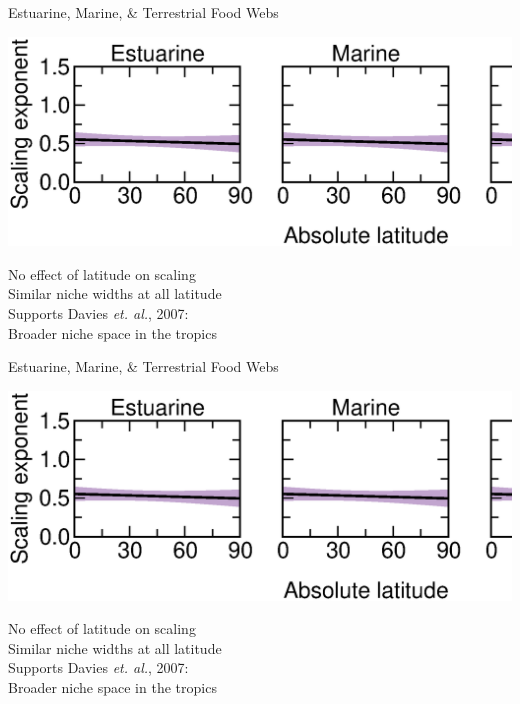 \documentclass{beamer}
\begin{document}
  \begin{frame}{Estuarine, Marine, \& Terrestrial Food Webs}
    \begin{center}
      \includegraphics*[width=.8\textwidth]{Figures/results/no_effect.eps}

      \vspace{1cm}
      No effect of latitude on scaling\\
      {\color{white}Similar niche widths at all latitude\\
      Supports Davies \emph{et. al.}, 2007:\\
      Broader niche space in the tropics}

    \end{center}
  \end{frame}


  \begin{frame}{Estuarine, Marine, \& Terrestrial Food Webs}
    \begin{center}
      \includegraphics*[width=.8\textwidth]{Figures/results/no_effect.eps}

      \vspace{1cm}
      No effect of latitude on scaling\\
      Similar niche widths at all latitude\\
      {\color{white} Supports Davies \emph{et. al.}, 2007:\\
      Broader niche space in the tropics}

    \end{center}
  \end{frame}
\end{document}
